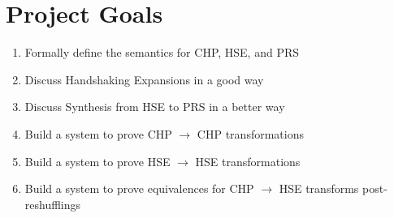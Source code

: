 \documentclass[times,10pt]{article}
\begin{document}
\section{Project Goals}

\begin{enumerate}

\item Formally define the semantics for CHP, HSE, and PRS

\item Discuss Handshaking Expansions in a good way 

\item Discuss Synthesis from HSE to PRS in a better way

\item Build a system to prove CHP $\rightarrow$ CHP transformations

\item Build a system to prove HSE $\rightarrow$ HSE transformations

\item Build a system to prove equivalences for CHP $\rightarrow$ HSE transforms post-reshufflings

\end{enumerate}
\end{document}
